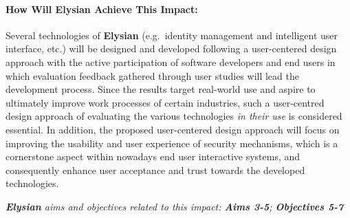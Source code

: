 \documentclass[a4paper,11pt]{article}
\newcommand{\project}[1]{\textbf{#1}\xspace}
\newcommand{\SECURITY}{\project{Elysian}}
\newcommand{\TheProject}{\SECURITY}
\begin{document}
\begin{mdframed}[backgroundcolor=gray!10]

\paragraph{How Will \TheProject{} Achieve This Impact:} Several technologies of \TheProject{} (e.g.~identity management and intelligent user interface, etc.) will be designed and developed following a user-centered design approach with the active participation of software developers and end users in which evaluation feedback gathered through user studies will lead the development process. 
Since the results target real-world use and aspire to ultimately improve work processes of certain industries, such a user-centred design approach of evaluating the various technologies \emph{in their use} is considered essential. In addition, the proposed user-centered design approach will focus on improving the usability and user experience of security mechanisms, which is a cornerstone aspect within nowadays end user interactive systems, and consequently enhance user acceptance and trust towards the developed technologies.

\emph{\TheProject{} aims and objectives related to this impact: \textbf{Aims 3-5}; \textbf{Objectives 5-7} }
\end{mdframed}
\end{document}
